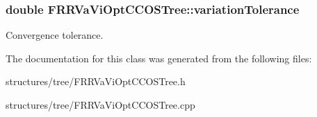 \subsubsection[{\texorpdfstring{variation\+Tolerance}{variationTolerance}}]{\setlength{\rightskip}{0pt plus 5cm}double F\+R\+R\+Va\+Vi\+Opt\+C\+C\+O\+S\+Tree\+::variation\+Tolerance\hspace{0.3cm}{\ttfamily [private]}}\hypertarget{class_f_r_r_va_vi_opt_c_c_o_s_tree_a3652da4e84bd04dcde60101b06f2cc08}{}\label{class_f_r_r_va_vi_opt_c_c_o_s_tree_a3652da4e84bd04dcde60101b06f2cc08}
Convergence tolerance. 

The documentation for this class was generated from the following files\+:\begin{DoxyCompactItemize}
\item 
structures/tree/F\+R\+R\+Va\+Vi\+Opt\+C\+C\+O\+S\+Tree.\+h\item 
structures/tree/F\+R\+R\+Va\+Vi\+Opt\+C\+C\+O\+S\+Tree.\+cpp\end{DoxyCompactItemize}
